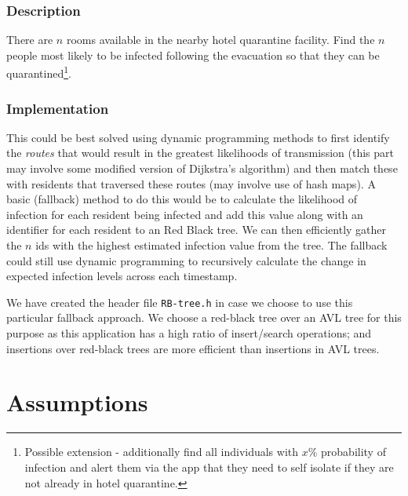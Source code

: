 \documentclass{article}
\begin{document}
\subsubsection{Description}
        There are $n$ rooms available in the nearby hotel quarantine facility. Find the $n$ people most likely to be infected following the evacuation so that they can be quarantined\footnote{Possible extension - additionally find all individuals with $x\%$ probability of infection and alert them via the app that they need to self isolate if they are not already in hotel quarantine.}.
        
\subsubsection{Implementation}
        This could be best solved using dynamic programming methods to first identify the \textit{routes} that would result in the greatest likelihoods of transmission (this part may involve some modified version of Dijkstra's algorithm) and then match these with residents that traversed these routes (may involve use of hash maps). A basic (fallback) method to do this would be to calculate the likelihood of infection for each resident being infected and add this value along with an identifier for each resident to an Red Black tree. We can then efficiently gather the $n$ ids with the highest estimated infection value from the tree. The fallback could still use dynamic programming to recursively calculate the change in expected infection levels across each timestamp.
        
        We have created the header file \texttt{RB-tree.h} in case we choose to use this particular fallback approach. We choose a red-black tree over an AVL tree for this purpose as this application has a high ratio of insert/search operations; and insertions over red-black trees are more efficient than insertions in AVL trees.
    

\section{Assumptions}
\end{document}
